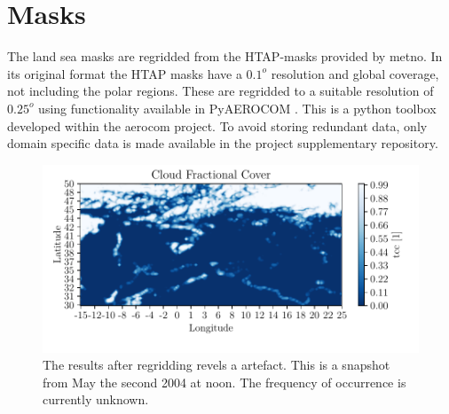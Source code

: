 \section{Masks} \label{sec:mask}
The land sea masks are regridded from the HTAP-masks provided by \acrfull{metno}.  In its original format the HTAP masks have a $0.1^o$ resolution and global coverage, not including the polar regions. These are regridded to a suitable resolution of $0.25^o$ using functionality available in PyAEROCOM \cite{pyaerocom}. %
This is a python toolbox developed within the \acrfull{aerocom} project.
To avoid storing redundant data, only domain specific data is made available in the project supplementary repository. %
\begin{figure}
    \centering
    \includegraphics{python_figs/example_artefact.pdf}
    \caption[Artefact in European Cloud Cover dataset.]{The results after regridding revels a artefact. This is a snapshot from May the second 2004 at noon. The frequency of occurrence is currently unknown.}
    \label{fig:example_artefact}
\end{figure}
